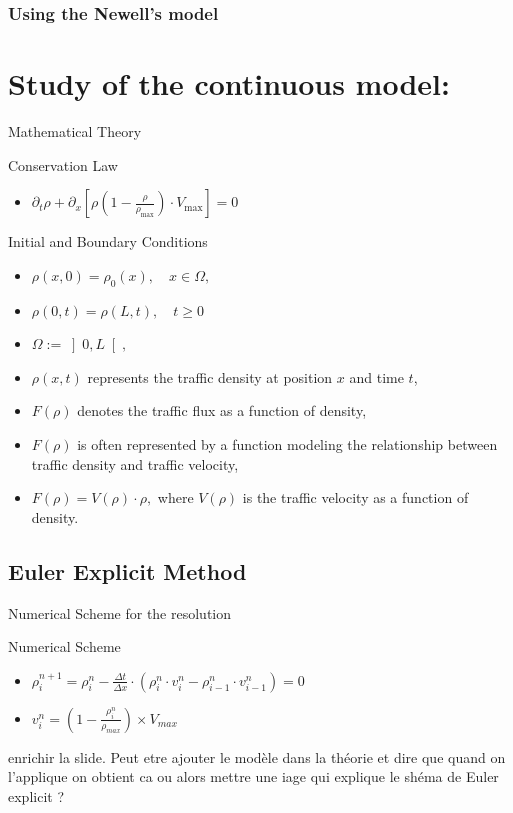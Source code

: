\documentclass{beamer}
\begin{document}
\subsubsection{Using the Newell's model}
\section{Study of the continuous model:}
\begin{frame}{Mathematical Theory}
	\begin{alertblock}{Conservation Law}
		\begin{itemize}
			\item $\partial_t\rho + \partial_x\left[ \rho\left( 1-\frac{\rho}{\rho_{\text{max}}}\right) \cdot V_{\text{max}}\right] = 0 $
		\end{itemize}
	\end{alertblock}
	\begin{block}{Initial and Boundary Conditions}
		\begin{itemize}
			\item $\rho(x,0) = \rho_0(x), \quad x \in \Omega,$
			\item $\rho(0,t) = \rho(L,t), \quad t \geq 0$
			\item $\Omega := \left] 0,L\right[, $
			\item $\rho(x,t)$ represents the traffic density at position $x$ and time $t$, 
			\item $F(\rho)$ denotes the traffic flux as a function of density,
			\item $F(\rho)$ is often represented by a function modeling the relationship between traffic density and traffic velocity,
			\item $F(\rho) = V(\rho) \cdot \rho,$ where $V(\rho)$ is the traffic velocity as a function of density.
		\end{itemize}
	\end{block}
\end{frame}

\subsection{Euler Explicit Method}
\begin{frame}{Numerical Scheme for the resolution}
	\begin{alertblock}{Numerical Scheme}
		\begin{itemize}
			\item $\rho_{i}^{n+1} = \rho_i^n - \frac{\Delta t}{\Delta x} \cdot \left(\rho_i^n \cdot v_i^n - \rho_{i-1}^n \cdot v_{i-1}^n \right)
					=0$
		
			\item $v_i^n = \left( 1 - \frac{\rho_i^n}{\rho_{max}}\right)  \times V_{max}$
		\end{itemize}
	\end{alertblock}
	enrichir la slide. Peut etre ajouter le modèle dans la théorie et dire que quand on l'applique on obtient ca ou alors mettre une iage qui explique le shéma de Euler explicit ? 

\end{frame}
\end{document}
